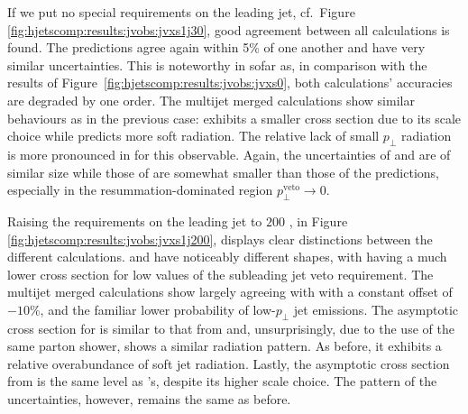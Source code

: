 If we put no special requirements on the leading jet, cf.\ Figure 
\ref{fig:hjetscomp:results:jvobs:jvxs1j30}, good agreement 
between all calculations is found. The \NNLOPS predictions agree again within 
5\% of one another and have very similar uncertainties. This is noteworthy 
in sofar as, in comparison with the results of 
Figure~\ref{fig:hjetscomp:results:jvobs:jvxs0}, both calculations' 
accuracies are degraded by one order. The multijet merged calculations 
show similar behaviours as in the previous case: \MGaMC exhibits a smaller cross section due to 
its scale choice while \Sherpa \MEPSatNLO predicts more soft radiation. 
The relative lack of small $p_\perp$ radiation is more 
pronounced in \Herwig for this observable. Again, the uncertainties of \MGaMC and \Sherpa 
are of similar size while those of \Herwig are somewhat smaller than those of the \NNLOPS 
predictions, especially in the resummation-dominated region 
$p_\perp^\text{veto}\to 0$.

Raising the requirements on the leading jet to $200$ \gev, in Figure 
\ref{fig:hjetscomp:results:jvobs:jvxs1j200}, displays clear distinctions 
between the different calculations.  
\Sherpa \NNLOPS and \Powheg \NNLOPS have noticeably different shapes, with \Sherpa having a 
much lower cross section for low values of the subleading jet veto requirement. 
The multijet merged calculations show \Herwig largely agreeing with 
\Powheg with a constant offset of $-10\%$, and the familiar lower 
probability of low-$p_\perp$ jet emissions. 
The asymptotic cross section for \Sherpa \MEPSatNLO is similar to that from \Sherpa \NNLOPS and, 
unsurprisingly, due to the use of the same parton shower, shows a 
similar radiation pattern. As before, it exhibits 
a relative overabundance of soft jet radiation. Lastly, the asymptotic cross section from \MGaMC 
is the same level as \Powheg's, despite 
its higher scale choice. The pattern of the uncertainties, however, 
remains the same as before.

